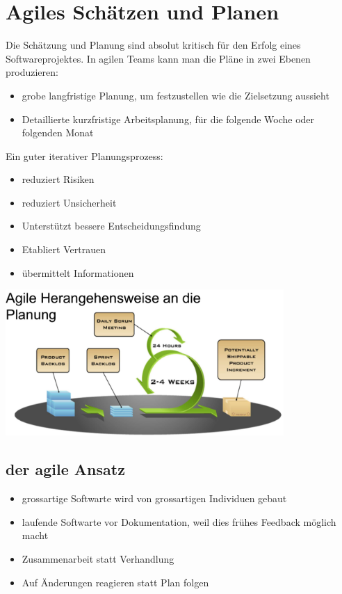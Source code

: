\documentclass{report}
\newenvironment{Figure}
	{\par\medskip\noindent\minipage{\linewidth}}
	{\endminipage\par\medskip}
\theoremstyle{definition}
\theoremstyle{example}
\begin{document}
\chapter{Agiles Schätzen und Planen}
Die Schätzung und Planung sind absolut kritisch für den Erfolg eines Softwareprojektes. In agilen Teams kann man die Pläne in zwei Ebenen produzieren:
\begin{itemize}
	\item grobe langfristige Planung, um festzustellen wie die Zielsetzung aussieht
	\item Detaillierte kurzfristige Arbeitsplanung, für die folgende Woche oder folgenden Monat
\end{itemize}

Ein guter iterativer Planungsprozess:
\begin{itemize}
	\item reduziert Risiken
	\item reduziert Unsicherheit
	\item Unterstützt bessere Entscheidungsfindung
	\item Etabliert Vertrauen
	\item übermittelt Informationen
\end{itemize}

\begin{Figure}
\centering
\includegraphics[width=400px]{img/HerangehensweiseAnDiePlanung.png}
	\label{fig:Herangehensweise an die Planung}
\end{Figure}

\section{der agile Ansatz}
\begin{itemize}
	\item grossartige Softwarte wird von grossartigen Individuen gebaut
	\item laufende Softwarte vor Dokumentation, weil dies frühes Feedback möglich macht
	\item Zusammenarbeit statt Verhandlung
	\item Auf Änderungen reagieren statt Plan folgen
\end{itemize}
\end{document}
